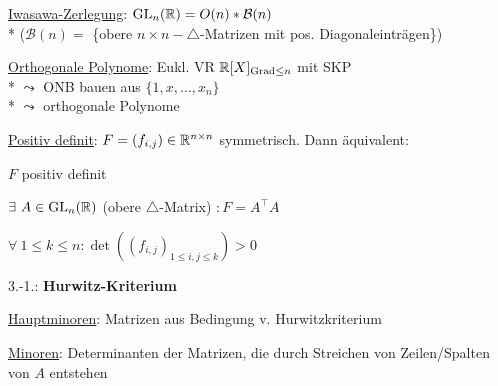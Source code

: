 \begin{items}
	\item \underline{Iwasawa-Zerlegung}: \( \text{GL}_n(\mathbb{R}) = O(n)*\mathcal{B}(n) \) \\* (\( \mathcal{B}(n) = \) \{obere \( n \times n-\triangle\)-Matrizen mit pos. Diagonaleinträgen\})

	\item \underline{Orthogonale Polynome}: Eukl. VR \( \mathbb{R}[X]_{\text{Grad} \leq n} \) mit SKP
		\\*
		\( \leadsto \) ONB bauen aus \( \{ 1, x, \dots, x_n \} \)
		\\*
		\( \leadsto \) orthogonale Polynome
	\item \underline{Positiv definit}: \( F = (f_{i,j}) \in \mathbb{R}^{n \times n} \) symmetrisch. Dann äquivalent:
		\begin{enumeration}
			\item \( F \) positiv definit
			\item \( \exists \ A \in \text{GL}_n(\mathbb{R}) \) (obere \( \triangle \)-Matrix) \( : F = A^\top A \)
			\item \( \forall \ 1 \leq k \leq n: \det((f_{i,j})_{1 \leq i,j \leq k}) > 0 \)
		\end{enumeration}
		3.-1.: \textbf{Hurwitz-Kriterium}

	\item \underline{Hauptminoren}: Matrizen aus Bedingung v. Hurwitzkriterium
	\item \underline{Minoren}: Determinanten der Matrizen, die durch Streichen von Zeilen/Spalten von \( A \) entstehen
\end{items}

\newpage

